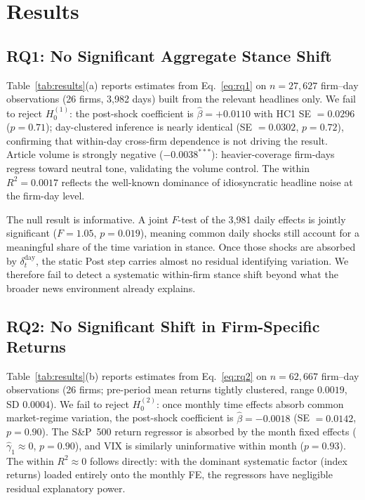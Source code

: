 \documentclass[conference]{IEEEtran}
\begin{document}
\section{Results}
\label{sec:results}

\subsection{RQ1: No Significant Aggregate Stance Shift}

Table~\ref{tab:results}(a) reports estimates from Eq.~\eqref{eq:rq1} on $n=27{,}627$
firm--day observations (26 firms, 3,982 days) built from the relevant headlines only.
We fail to reject $H_0^{(1)}$: the post-shock coefficient is $\hat{\beta}=+0.0110$
with HC1 SE $=0.0296$ ($p=0.71$); day-clustered inference is nearly identical
(SE $=0.0302$, $p=0.72$), confirming that within-day cross-firm dependence is not
driving the result. Article volume is strongly negative ($-0.0038^{***}$):
heavier-coverage firm-days regress toward neutral tone, validating the volume control.
The within $R^2=0.0017$ reflects the well-known dominance of idiosyncratic
headline noise at the firm-day level.


The null result is informative. A joint $F$-test of the 3,981 daily effects is
jointly significant ($F=1.05$, $p=0.019$), meaning common daily shocks still account
for a meaningful share of the time variation in stance. Once those shocks are absorbed
by $\delta_t^{\text{day}}$, the static Post step carries almost no residual
identifying variation. We therefore fail to detect a systematic within-firm stance
shift beyond what the broader news environment already explains.

\subsection{RQ2: No Significant Shift in Firm-Specific Returns}

Table~\ref{tab:results}(b) reports estimates from Eq.~\eqref{eq:rq2} on $n=62{,}667$
firm--day observations (26 firms; pre-period mean returns tightly clustered,
range $0.0019$, SD $0.0004$). We fail to reject $H_0^{(2)}$: once monthly
time effects absorb common market-regime variation, the post-shock coefficient
is $\hat{\beta}=-0.0018$ (SE $=0.0142$, $p=0.90$). The S\&P~500 return regressor
is absorbed by the month fixed effects ($\hat{\gamma}_1 \approx 0$, $p=0.90$),
and VIX is similarly uninformative within month ($p=0.93$). The within
$R^2\approx0$ follows directly: with the dominant systematic factor (index
returns) loaded entirely onto the monthly FE, the regressors have negligible
residual explanatory power.
\end{document}
